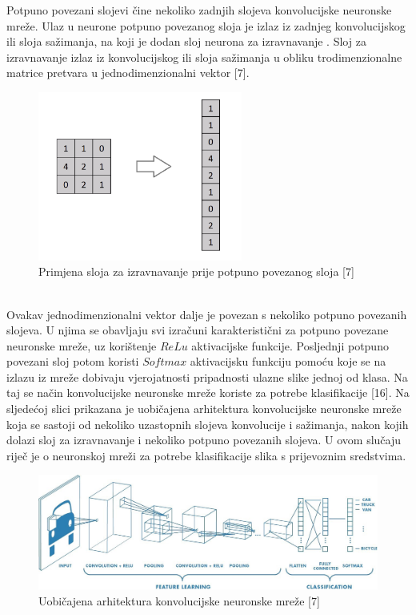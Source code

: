 \documentclass[times, utf8, zavrsni]{fer}
\begin{document}
Potpuno povezani slojevi  čine nekoliko zadnjih slojeva konvolucijske neuronske mreže. Ulaz u neurone potpuno povezanog sloja je izlaz iz zadnjeg konvolucijskog ili sloja sažimanja, na koji je dodan sloj neurona za izravnavanje . Sloj za izravnavanje izlaz iz konvolucijskog ili sloja sažimanja u obliku trodimenzionalne matrice pretvara u jednodimenzionalni vektor [7]. 
% 
\begin{figure}[!h]
\centering
\includegraphics[width=0.6\textwidth]{./slike/flatten}
\caption{Primjena sloja za izravnavanje prije potpuno povezanog sloja [7]}
\label{fig:flatten}
\end{figure}
%
\\
Ovakav jednodimenzionalni vektor dalje je povezan s nekoliko potpuno povezanih slojeva. U njima se obavljaju svi izračuni karakteristični za potpuno povezane neuronske mreže, uz korištenje $ReLu$ aktivacijske funkcije. Posljednji potpuno povezani sloj potom koristi $Softmax$ aktivacijsku funkciju pomoću koje se na izlazu iz mreže dobivaju vjerojatnosti pripadnosti ulazne slike jednoj od klasa. Na taj se način konvolucijske neuronske mreže koriste za potrebe klasifikacije [16]. Na sljedećoj slici prikazana je uobičajena arhitektura konvolucijske neuronske mreže koja se sastoji od nekoliko uzastopnih slojeva konvolucije i sažimanja, nakon kojih dolazi sloj za izravnavanje i nekoliko potpuno povezanih slojeva. U ovom slučaju riječ je o neuronskoj mreži za potrebe klasifikacije slika s prijevoznim sredstvima.
% 
\begin{figure}[!h]
\hspace{-0.05\textwidth}
\includegraphics[width=1.1\textwidth]{./slike/convolutionnet}
\caption{Uobičajena arhitektura konvolucijske neuronske mreže [7]}
\label{fig:conv-arch}
\end{figure}
%
\end{document}
